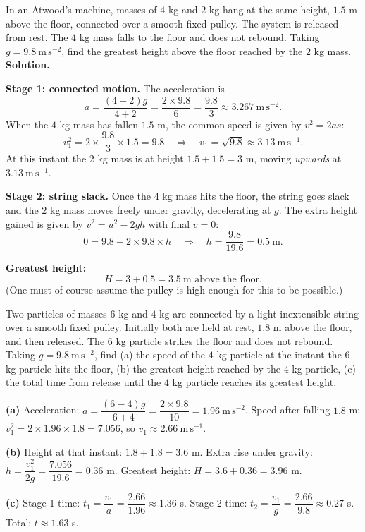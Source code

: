 \documentclass[11pt]{article}
\begin{document}
\begin{exoresolu}
In an Atwood's machine, masses of $4$ kg and $2$ kg hang at the same height, $1.5$ m above the floor, connected over a smooth fixed pulley. The system is released from rest. The $4$ kg mass falls to the floor and does not rebound. Taking $g = 9.8\ \mathrm{m\,s^{-2}}$, find the greatest height above the floor reached by the $2$ kg mass.
\tcblower
\textbf{Solution.}

\textbf{Stage 1: connected motion.} The acceleration is
\[ a = \frac{(4-2)g}{4+2} = \frac{2 \times 9.8}{6} = \frac{9.8}{3} \approx 3.267\ \mathrm{m\,s^{-2}}. \]
When the $4$ kg mass has fallen $1.5$ m, the common speed is given by $v^2 = 2as$:
\[ v_1^2 = 2 \times \frac{9.8}{3} \times 1.5 = 9.8 \quad\Longrightarrow\quad v_1 = \sqrt{9.8} \approx 3.13\ \mathrm{m\,s^{-1}}. \]
At this instant the $2$ kg mass is at height $1.5 + 1.5 = 3$ m, moving \emph{upwards} at $3.13\ \mathrm{m\,s^{-1}}$.

\textbf{Stage 2: string slack.} Once the $4$ kg mass hits the floor, the string goes slack and the $2$ kg mass moves freely under gravity, decelerating at $g$. The extra height gained is given by $v^2 = u^2 - 2gh$ with final $v = 0$:
\[ 0 = 9.8 - 2 \times 9.8 \times h \quad\Longrightarrow\quad h = \frac{9.8}{19.6} = 0.5\ \mathrm{m}. \]

\textbf{Greatest height:}
\[ H = 3 + 0.5 = 3.5\ \mathrm{m} \text{ above the floor.} \]
(One must of course assume the pulley is high enough for this to be possible.)
\end{exoresolu}

\begin{exercice}
Two particles of masses $6$ kg and $4$ kg are connected by a light inextensible string over a smooth fixed pulley. Initially both are held at rest, $1.8$ m above the floor, and then released. The $6$ kg particle strikes the floor and does not rebound. Taking $g = 9.8\ \mathrm{m\,s^{-2}}$, find (a) the speed of the $4$ kg particle at the instant the $6$ kg particle hits the floor, (b) the greatest height reached by the $4$ kg particle, (c) the total time from release until the $4$ kg particle reaches its greatest height.
\end{exercice}

\begin{corrige}[Exercise 1]
\textbf{(a)} Acceleration: $a = \dfrac{(6-4)g}{6+4} = \dfrac{2 \times 9.8}{10} = 1.96\ \mathrm{m\,s^{-2}}$. Speed after falling $1.8$ m: $v_1^2 = 2 \times 1.96 \times 1.8 = 7.056$, so $v_1 \approx 2.66\ \mathrm{m\,s^{-1}}$.

\textbf{(b)} Height at that instant: $1.8 + 1.8 = 3.6$ m. Extra rise under gravity: $h = \dfrac{v_1^2}{2g} = \dfrac{7.056}{19.6} = 0.36$ m. Greatest height: $H = 3.6 + 0.36 = 3.96$ m.

\textbf{(c)} Stage 1 time: $t_1 = \dfrac{v_1}{a} = \dfrac{2.66}{1.96} \approx 1.36$ s. Stage 2 time: $t_2 = \dfrac{v_1}{g} = \dfrac{2.66}{9.8} \approx 0.27$ s. Total: $t \approx 1.63$ s.
\end{corrige}
\end{document}

